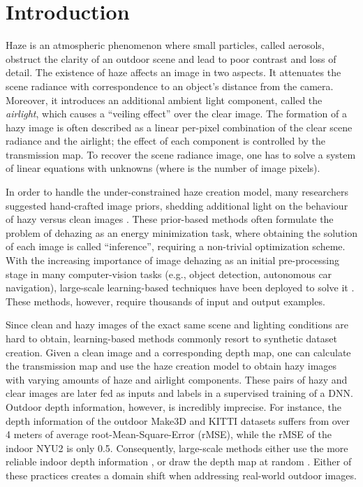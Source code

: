 \documentclass[10pt,twocolumn,twoside]{IEEEtran}
\begin{document}
\section{Introduction}

Haze is an atmospheric phenomenon where small particles, called aerosols, obstruct the clarity of an outdoor scene and lead to poor contrast and loss of detail. The existence of haze affects an image in two aspects. It attenuates the scene radiance with correspondence to an object's distance from the camera. Moreover, it introduces an additional ambient light component, called the \textit{airlight}, which causes a ``veiling effect'' over the clear image. The formation of a hazy image is often described as a linear per-pixel combination of the clear scene radiance and the airlight; the effect of each component is controlled by the transmission map. To recover the scene radiance image, one has to solve a system of  linear equations with  unknowns (where  is the number of image pixels).

In order to handle the under-constrained haze creation model, many researchers suggested hand-crafted image priors, shedding additional light on the behaviour of hazy versus clean images \cite{fattal_dehazing, contrast_tan, DCP, tarel_dehazing, color_lines, CAP, NLD, BCCR, hue_dehazing}. These prior-based methods often formulate the problem of dehazing as an energy minimization task, where obtaining the solution of each image is called ``inference'', requiring a non-trivial optimization scheme.
With the increasing importance of image dehazing as an initial pre-processing stage in many computer-vision tasks (e.g., object detection, autonomous car navigation), large-scale learning-based techniques have been deployed to solve it \cite{aodnet,dehazenet,mscnn,GFN, VGG_dehazing}. These methods, however, require thousands of input and output examples.

Since clean and hazy images of the exact same scene and lighting conditions are hard to obtain, learning-based methods commonly resort to synthetic dataset creation. Given a clean image and a corresponding depth map, one can calculate the transmission map and use the haze creation model to obtain hazy images with varying amounts of haze and airlight components. These pairs of hazy and clear images are later fed as inputs and labels in a supervised training of a DNN. 
Outdoor depth information, however, is incredibly imprecise. For instance, the depth information of the outdoor Make3D \cite{make3d} and KITTI \cite{kitti} datasets suffers from over 4 meters of average root-Mean-Square-Error (rMSE), while the rMSE of the indoor NYU2 \cite{NYU2} is only 0.5. Consequently, large-scale methods either use the more reliable indoor depth information \cite{mscnn,aodnet,GFN,VGG_dehazing}, or draw the depth map at random \cite{CAP,dehazenet}. Either of these practices creates a domain shift when addressing real-world outdoor images. 
\end{document}
